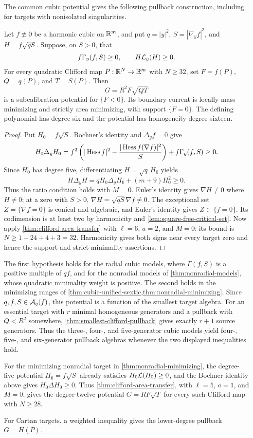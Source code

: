 The common cubic potential gives the following pullback construction,
including for targets with nonisolated singularities.

\begin{corollary}
\label{cor:common-cubic-pullback}
Let \(f\not\equiv0\) be a harmonic cubic on \(\mathbb R^m\), and put
\(q=|y|^2\), \(S=|\nabla_yf|^2\), and \(H=f\sqrt{qS}\).
Suppose, on \(S>0\), that
\[
 f\Gamma_y(f,S)\geq0,\qquad H\mathcal L_y(H)\geq0.
\]
For every quadratic Clifford map \(P:\mathbb R^N\to\mathbb R^m\) with
\(N\geq32\), set \(F=f(P)\), \(Q=q(P)\), and \(T=S(P)\).
Then
\[
 G=R^2F\sqrt{QT}
\]
is a subcalibration potential for \(\{F<0\}\). Its boundary current
is locally mass minimizing and strictly area minimizing, with support
\(\{F=0\}\).
The defining polynomial has degree six and the potential has
homogeneity degree sixteen.
\end{corollary}

\begin{proof}
Put \(H_0=f\sqrt S\). Bochner's identity and \(\Delta_y f=0\) give
\[
 H_0\Delta_yH_0
 =f^2\left(|\operatorname{Hess} f|^2-
       \frac{|\operatorname{Hess} f(\nabla f)|^2}{S}\right)
       +f\Gamma_y(f,S)\geq0.
\]
Since \(H_0\) has degree five, differentiating \(H=\sqrt q\,H_0\)
yields
\[
 H\Delta_yH=qH_0\Delta_yH_0+(m+9)H_0^2\geq0.
\]
Thus the ratio condition holds with \(M=0\). Euler's identity gives
\(\nabla H\ne0\) where \(H\ne0\); at a zero with \(S>0\),
\(\nabla H=\sqrt{qS}\nabla f\ne0\).
The exceptional set \(Z=\{\nabla f=0\}\) is conical and algebraic,
and Euler's identity gives \(Z\subset\{f=0\}\).
Its codimension is at least two by harmonicity and
\cref{lem:square-free-critical-set}.
Now apply \cref{thm:clifford-area-transfer} with \(\ell=6\),
\(a=2\), and \(M=0\): its bound is \(N\geq1+24+4+3=32\).
Harmonicity gives both signs near every target zero and hence the
support and strict-minimality assertions.
\end{proof}

The first hypothesis holds for the radial cubic models, where
\(\Gamma(f,S)\) is a positive multiple of \(qf\), and for the
nonradial models of \cref{thm:nonradial-models}, whose quadratic
minimality weight is positive. The second holds in the minimizing ranges of
\cref{thm:cubic-unified-sextic,thm:nonradial-minimizing}.
Since \(q,f,S\in\mathcal A_q(f)\), this potential is a function of the
smallest target algebra. For an essential target with \(r\) minimal
homogeneous generators and a pullback with \(Q<R^2\) somewhere,
\cref{thm:smallest-clifford-pullback} gives exactly \(r+1\) source
generators. Thus the three-, four-, and five-generator cubic models
yield four-, five-, and six-generator pullback algebras whenever the
two displayed inequalities hold.

For the minimizing nonradial target in \cref{thm:nonradial-minimizing},
the degree-five potential \(H_0=f\sqrt S\) already satisfies
\(H_0\mathcal L(H_0)\ge0\), and the Bochner identity above gives
\(H_0\Delta H_0\ge0\). Thus \cref{thm:clifford-area-transfer}, with
\(\ell=5\), \(a=1\), and \(M=0\), gives the degree-twelve potential
\(G=RF\sqrt T\) for every such Clifford map with \(N\ge28\).

For Cartan targets, a weighted inequality gives the lower-degree
pullback \(G=H(P)\).
